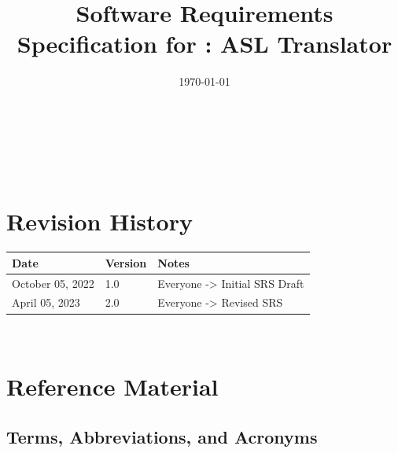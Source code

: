 \documentclass[12pt]{article}
\begin{document}
\title{Software Requirements Specification for \progname: ASL Translator} 
\author{\authname}
\date{\today}

\maketitle

~\newpage


\tableofcontents

~\newpage

\section*{Revision History}

\begin{tabularx}{\textwidth}{p{4cm}p{2cm}X}
\toprule {\bf Date  } & {\bf Version} & {\bf Notes}\\
\midrule
October 05, 2022 & 1.0 & Everyone -> Initial SRS Draft\\
April 05, 2023 & 2.0 & Everyone -> Revised SRS\\

\bottomrule
\end{tabularx}

~\newpage

\section{Reference Material}

\subsection{Terms, Abbreviations, and Acronyms}
\end{document}
